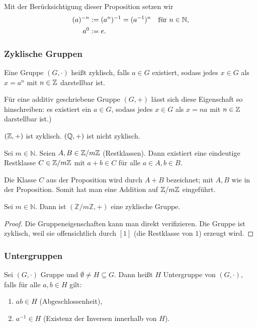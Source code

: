 \noindent Mit der Berücksichtigung dieser Proposition setzen wir 
\begin{align*}
	(a)^{-n} &:= (a^{n})^{-1} = (a^{-1})^{n} \quad\text{für } n \in \mathbb N,\\
	a^{0} &:= e. 
\end{align*}

\subsubsection{Zyklische Gruppen}
Eine Gruppe $ (G, \cdot) $ heißt zyklisch, falls $ a \in G $ existiert, sodass jedes $ x \in G $ als $ x = a^n $ mit $ n \in \mathbb Z $ darstellbar ist. 

Für eine additiv geschriebene Gruppe $ (G, +) $ lässt sich diese Eigenschaft so hinschreiben: es existiert ein $ a \in G $, sodass jedes $ x \in G $ als $ x = na $ mit $ n \in \mathbb Z $ darstellbar ist.)


\begin{bsp}
	$ (\mathbb Z, +) $ ist zyklisch. $ (\mathbb Q, +) $ ist nicht zyklisch.
\end{bsp}

\begin{propn}
	Sei $ m \in \mathbb{N} $. Seien $ A,B \in \mathbb Z / m\mathbb{Z} $ (Restklassen). Dann existiert eine eindeutige Restklasse $ C \in \mathbb Z/m\mathbb Z $ mit $ a+b \in C $ für alle $ a \in A, b \in B $.
\end{propn}

\noindent Die Klasse $ C $ aus der Proposition wird durch $ A+B $ bezeichnet; mit $ A,B $ wie in der Proposition. Somit hat man eine Addition auf $ \mathbb Z/m\mathbb Z $ eingeführt.

\begin{propn}
	Sei $ m \in \mathbb{N} $. Dann ist $ ( \mathbb{Z} / m\mathbb{Z} , +) $ eine zyklische Gruppe.
\end{propn}
\begin{proof}
	Die Gruppeneigenschaften kann man direkt verifizieren. Die Gruppe ist zyklisch, weil sie offensichtlich durch $[1]$ (die Restklasse von $1$) erzeugt wird. 
\end{proof}

\subsubsection{Untergruppen}
Sei $ (G, \cdot) $ Gruppe und $ \emptyset \ne H \subseteq G $. Dann heißt $ H $ Untergruppe von $ (G, \cdot) $, falls für alle $ a,b \in H $ gilt:
\begin{enumerate}
	\item $ ab \in H $ (Abgeschlossenheit),
	\item $ a^{-1} \in H $ (Existenz der Inversen innerhalb von $ H $).
\end{enumerate}

